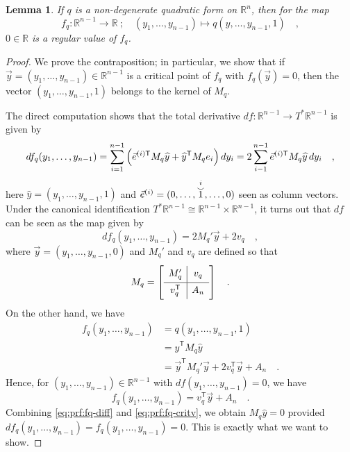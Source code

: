 \documentclass[pdftex,a4paper,12pt]{scrartcl}
\theoremstyle{plain}
\newtheorem{lemma}[theorem]{Lemma}
\theoremstyle{definition}
\theoremstyle{remark}
\begin{document}
\begin{lemma}
If $q$ is a non-degenerate quadratic form on $\mathbb R^n$, then for the map
\[
f_q:\mathbb R^{n-1}\to\mathbb R\ ;\quad (y_1,\dots,y_{n-1}) \mapsto q(y,\dots ,y_{n-1},1)
\quad,
\]
$0\in\mathbb R$ is a regular value of $f_q$.
\end{lemma}
\begin{proof}
We prove the contraposition; in particular, we show that if $\vec y=(y_1,\dots,y_{n-1})\in\mathbb R^{n-1}$ is a critical point of $f_q$ with $f_q(\vec y)=0$, then the vector $(y_1,\dots,y_{n-1},1)$ belongs to the kernel of $M_q$.

The direct computation shows that the total derivative $df:\mathbb R^{n-1}\to T^\ast\mathbb R^{n-1}$ is given by
\[
df_q(y_1,\dots,y_{n-1})
= \sum_{i=1}^{n-1}\left(\vec e^{(i)\mathsf T} M_q\widehat y+\widehat y^{\mathsf T} M_q e_i\right) dy_i \\
= 2 \sum_{i-1}^{n-1} \vec e^{(i)\mathsf T}M_q\widehat y\, dy_i
\quad,
\]
here $\widehat y=(y_1,\dots,y_{n-1},1)$ and $\vec e^{(i)}=(0,\dots,\overset{\substack{i\\\smash\smile}}{1},\dots,0)$ seen as column vectors.
Under the canonical identification $T^\ast\mathbb R^{n-1}\cong \mathbb R^{n-1}\times\mathbb R^{n-1}$, it turns out that $df$ can be seen as the map given by
\begin{equation}
\label{eq:prf:fq-diff}
df_q(y_1,\dots,y_{n-1})
= 2M_q'\vec y+ 2v_q
\quad,
\end{equation}
where $\vec y=(y_1,\dots,y_{n-1},0)$ and $M_q'$ and $v_q$ are defined so that
\[
M_q =
\left[
\begin{array}{c|c}
  M_q' & v_q  \rule[-1.5ex]{0pt}{4ex}\\\hline\rule[-1.5ex]{0pt}{4ex}
  v_q^{\mathsf T} & A_n
\end{array}
\right]
\quad.
\]
On the other hand, we have
\[
\begin{split}
f_q(y_1,\dots,y_{n-1})
&= q(y_1,\dots,y_{n-1},1) \\
&= \widehat y^{\mathsf T} M_q\widehat y \\
&= \vec y^{\mathsf T} M_q'\vec y + 2v_q^{\mathsf T}\vec y + A_n
\quad.
\end{split}
\]
Hence, for $(y_1,\dots,y_{n-1})\in\mathbb R^{n-1}$ with $df(y_1,\dots,y_{n-1})=0$, we have
\begin{equation}
\label{eq:prf:fq-critv}
f_q(y_1,\dots,y_{n-1})
= v_q^{\mathsf T}\vec y + A_n
\quad.
\end{equation}
Combining \eqref{eq:prf:fq-diff} and \eqref{eq:prf:fq-critv}, we obtain $M_q\widehat y=0$ provided $df_q(y_1,\dots,y_{n-1})=f_q(y_1,\dots,y_{n-1})=0$.
This is exactly what we want to show.
\end{proof}
\end{document}
